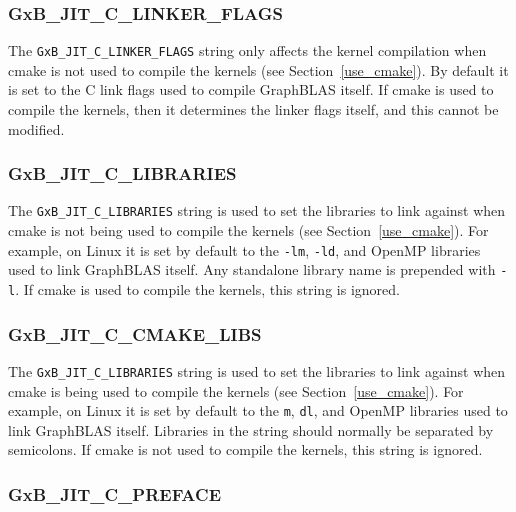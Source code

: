 \subsubsection{\sf GxB\_JIT\_C\_LINKER\_FLAGS}

The \verb'GxB_JIT_C_LINKER_FLAGS' string only affects the kernel compilation
when cmake is not used to compile the kernels (see Section~\ref{use_cmake}).
By default it is set to the C link flags used to compile GraphBLAS itself.
If cmake is used to compile the kernels, then it determines the linker flags
itself, and this cannot be modified.

\subsubsection{\sf GxB\_JIT\_C\_LIBRARIES}

The \verb'GxB_JIT_C_LIBRARIES' string is used to set the libraries to link
against when cmake is not being used to compile the kernels (see
Section~\ref{use_cmake}).  For example, on Linux it is set by default to the
\verb'-lm', \verb'-ld', and OpenMP libraries used to link GraphBLAS itself.
Any standalone library name is prepended with \verb'-l'.  If cmake is used to
compile the kernels, this string is ignored.

\subsubsection{\sf GxB\_JIT\_C\_CMAKE\_LIBS}

The \verb'GxB_JIT_C_LIBRARIES' string is used to set the libraries to link
against when cmake is being used to compile the kernels (see
Section~\ref{use_cmake}).  For example, on Linux it is set by default to the
\verb'm', \verb'dl', and OpenMP libraries used to link GraphBLAS itself.
Libraries in the string should normally be separated by semicolons.  If cmake
is not used to compile the kernels, this string is ignored.

\subsubsection{\sf GxB\_JIT\_C\_PREFACE}

